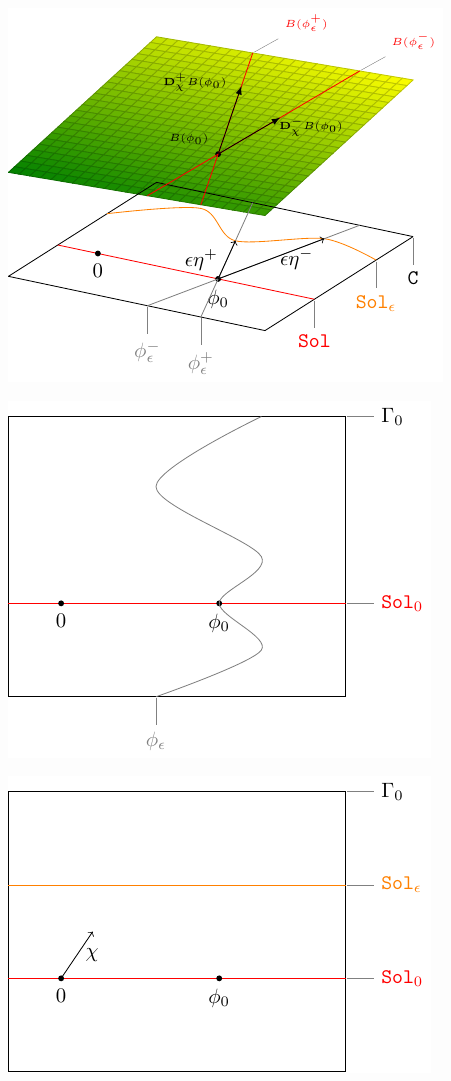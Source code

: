 \documentclass[Main]{subfiles}
\begin{document}
	\includegraphics[width=\textwidth]{Pictures/GeometricPictureLinear1}
				
	\includegraphics[width=\textwidth]{Pictures/compsupp_GeometricPicture0}
				
	\includegraphics[width=\textwidth]{Pictures/compsupp_GeometricPicture1}
				
\end{document}
